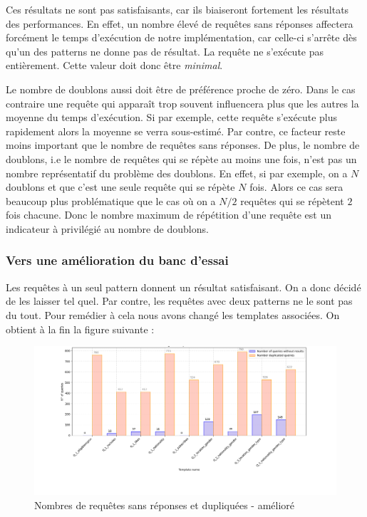 \documentclass[12pt,titlepage]{article}
\begin{document}
Ces résultats ne sont pas satisfaisants, car ils biaiseront fortement les résultats des performances. En effet, un nombre élevé de requêtes sans réponses affectera forcément le temps d'exécution de notre implémentation, car celle-ci s'arrête dès qu'un des patterns ne donne pas de résultat. La requête ne s'exécute pas entièrement. Cette valeur doit donc être \textit{minimal}.

Le nombre de doublons aussi doit être de préférence proche de zéro. Dans le cas contraire une requête qui apparaît trop souvent influencera plus que les autres la moyenne du temps d'exécution. Si par exemple, cette requête s'exécute plus rapidement alors la moyenne se verra sous-estimé. Par contre, ce facteur reste moins important que le nombre de requêtes sans réponses. De plus, le nombre de doublons, i.e le nombre de requêtes qui se répète au moins une fois, n'est pas un nombre représentatif du problème des doublons. En effet, si par exemple, on a $N$ doublons et que c'est une seule requête qui se répète $N$ fois. Alors ce cas sera beaucoup plus problématique que le cas où on a $N/2$ requêtes qui se répètent $2$ fois chacune. Donc le nombre maximum de répétition d'une requête est un indicateur à privilégié au nombre de doublons.

\subsubsection{Vers une amélioration du banc d'essai}

Les requêtes à un seul pattern donnent un résultat satisfaisant. On a donc décidé de les laisser tel quel. Par contre, les requêtes avec deux patterns ne le sont pas du tout. Pour remédier à cela nous avons changé les templates associées. On obtient à la fin la figure suivante :

\begin{figure}[!h]
\centering
\includegraphics[width=1.\textwidth]{img/zero_dup_per_template_ameliore.png}
\caption{Nombres de requêtes sans réponses et dupliquées - amélioré}
\label{zerodup2}
\end{figure}
\end{document}
